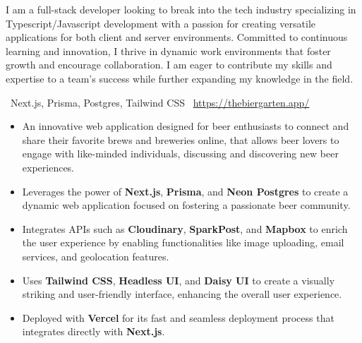 \documentclass[9pt,a4paper,withhyper]{altacv}
\begin{document}

\makecvheader
{}

\begin{paracol}{2}
	I am a full-stack developer looking to break into the tech industry specializing in Typescript/Javascript development with a passion for creating versatile applications for both client and server environments. 
	\vspace{0.5em}\newline
	Committed to continuous learning and innovation, I thrive in dynamic work environments that foster growth and encourage collaboration. I am eager to contribute my skills and expertise to a team's success while further expanding my knowledge in the field.
		
	\vspace{-0.25em}
	{\small \faCode\,\,\,Next.js, Prisma, Postgres, Tailwind CSS}\newline
	{\small \faDesktop\,\,\,\url{https://thebiergarten.app/}}
			
	\vspace{0.5em}
	\begin{itemize}
		\item An innovative web application designed for beer enthusiasts to connect and share their favorite brews and breweries online, that allows beer lovers to engage with like-minded individuals, discussing and discovering new beer experiences.
		\item Leverages the power of \textbf{Next.js}, \textbf{Prisma}, and \textbf{Neon Postgres} to create a dynamic web application focused on fostering a passionate beer community.
		\item Integrates APIs such as \textbf{Cloudinary}, \textbf{SparkPost}, and \textbf{Mapbox} to enrich the user experience by enabling functionalities like image uploading, email services, and geolocation features.
		\item Uses \textbf{Tailwind CSS}, \textbf{Headless UI}, and \textbf{Daisy UI} to create a visually striking and user-friendly interface, enhancing the overall user experience.
		\item Deployed with \textbf{Vercel} for its fast and seamless deployment process that integrates directly with \textbf{Next.js}.
	\end{itemize}
			  

\end{paracol}
\end{document}
